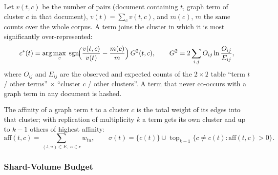 \documentclass[11pt, a4paper]{article}
\newif\ifdraftnotes
\newcommand{\todo}[1]{\ifdraftnotes\par\noindent{\small\color{red!75!black}\textbf{TODO:} #1}\par\fi}
\begin{document}
Let $v(t,c)$ be the number of pairs (document containing $t$, graph term of cluster $c$ in that document), $v(t)=\sum_c v(t,c)$, and $m(c)$, $m$ the same counts over the whole corpus.
A term joins the cluster in which it is most significantly over-represented:
\begin{equation}
	c^*(t)=\arg\max_{c}\;\operatorname{sgn}\!\Bigl(\frac{v(t,c)}{v(t)}-\frac{m(c)}{m}\Bigr)\,G^2(t,c),
	\qquad
	G^2=2\sum_{i,j} O_{ij}\ln\frac{O_{ij}}{E_{ij}},
	\label{eq:vote}
\end{equation}
where $O_{ij}$ and $E_{ij}$ are the observed and expected counts of the $2\times2$ table ``term $t$ / other terms'' $\times$ ``cluster $c$ / other clusters''.
A term that never co-occurs with a graph term in any document is hashed.

The affinity of a graph term $t$ to a cluster $c$ is the total weight of its edges into that cluster; with replication of multiplicity $k$ a term gets its own cluster and up to $k-1$ others of highest affinity:
\begin{equation}
	\mathrm{aff}(t,c)=\sum_{(t,u)\in E,\;u\in c} w_{tu},
	\qquad
	\sigma(t)=\{c(t)\}\cup\operatorname{top}_{k-1}\{c\neq c(t):\mathrm{aff}(t,c)>0\}.
	\label{eq:affinity}
\end{equation}

\subsubsection{Shard-Volume Budget}
\label{sec:budget}

\todo{Text: why a budget (by Eq.~\eqref{eq:lower-bound} a cluster of frequent terms gathers most of the corpus), the two steps~--- units and packing (Eq.~\eqref{eq:packing}), the number of shards follows from the budget. Materials: none.}
\end{document}
